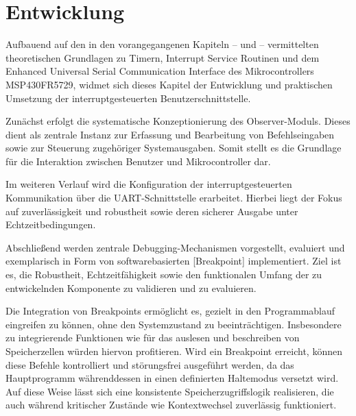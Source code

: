 

\chapter{Entwicklung}
\label{cha:Entwicklung}

Aufbauend auf den in den vorangegangenen Kapiteln --  und  -- vermittelten theoretischen Grundlagen zu Timern, Interrupt Service Routinen und dem Enhanced Universal Serial Communication Interface des Mikrocontrollers MSP430FR5729, widmet sich dieses Kapitel der Entwicklung und praktischen Umsetzung der interruptgesteuerten Benutzerschnittstelle.

Zun\"achst erfolgt die systematische Konzeptionierung des \glqq{}Observer-Moduls\grqq{}. Dieses dient als zentrale Instanz zur Erfassung und Bearbeitung von Befehlseingaben sowie zur Steuerung zugeh\"origer Systemausgaben. Somit stellt es die Grundlage f\"ur die Interaktion zwischen Benutzer und Mikrocontroller dar.

Im weiteren Verlauf wird die Konfiguration der interruptgesteuerten Kommunikation \"uber die UART-Schnittstelle erarbeitet. Hierbei liegt der Fokus auf zuverl\"assigkeit und robustheit sowie deren sicherer Ausgabe unter Echtzeitbedingungen.

Abschlie{\ss}end werden zentrale Debugging-Mechanismen vorgestellt, evaluiert und exemplarisch in Form von softwarebasierten [Breakpoint] implementiert. Ziel ist es, die Robustheit, Echtzeitf\"ahigkeit sowie den funktionalen Umfang der zu entwickelnden Komponente zu validieren und zu evaluieren.

Die Integration von Breakpoints erm\"oglicht es, gezielt in den Programmablauf eingreifen zu k\"onnen, ohne den Systemzustand zu beeintr\"achtigen. Insbesondere zu integrierende Funktionen wie \zB f\"ur das auslesen und beschreiben von Speicherzellen w\"urden hiervon profitieren. Wird ein Breakpoint erreicht, k\"onnen diese Befehle kontrolliert und st\"orungsfrei ausgef\"uhrt werden, da das Hauptprogramm w\"ahrenddessen in einen definierten Haltemodus versetzt wird. Auf diese Weise l\"asst sich eine konsistente Speicherzugriffslogik realisieren, die auch w\"ahrend kritischer Zust\"ande wie Kontextwechsel zuverl\"assig funktioniert.\AI

